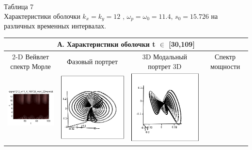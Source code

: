 \documentclass[12pt,letterpaper]{extreport}
\begin{document}
\begin{table}[H]

{\setlength{\arrayrulewidth}{1.25pt}
\begin{flushright}
Таблица 7\\
Характеристики оболочки $k_x=k_y=12$ , $\omega_p= \omega_0 =11.4$, $s_0=15.726$
на различных временных интервалах.

\end{flushright}
\begin{tabular}{|c|c|c|c|}

\hline
\multicolumn{4}{|c|}{А. Характеристики оболочки t $\in$ [30,109]}

\\
\hline
\footnotesize 2-D Вейвлет спектр Морле&\footnotesize Фазовый 
портрет&\footnotesize 3D
Модальный
портрет 3D&\footnotesize Спектр мощности\\
\hline
	\includegraphics[scale=1]{a1} 	
	&	
	\includegraphics[scale=1]{a2} 	
	&	
	\includegraphics[scale=1]{a3} 

\end{tabular}}
\end{table}
\end{document}
